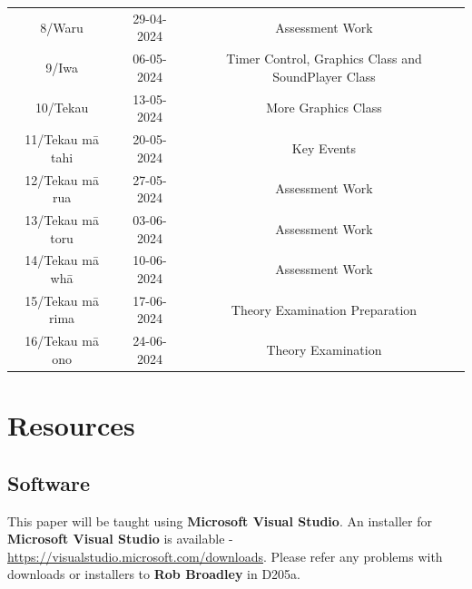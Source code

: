 \documentclass{article}
\begin{document}
\begin{tabular}{|c|c|c|c|}
	\rowcolor{yellow} \multicolumn{4}{|c|}{\footnotesize Mid Term Break}                                                                                                                         \\ \hline
	\footnotesize 8/Waru   & \footnotesize 29-04-2024 & \multicolumn{2}{c|}{\footnotesize Assessment Work}                                                   \\ \hline
	\footnotesize 9/Iwa            & \footnotesize 06-05-2024 & \multicolumn{2}{c|}{\footnotesize Timer Control, Graphics Class and SoundPlayer Class}                                                                 \\ \hline
	\footnotesize 10/Tekau         & \footnotesize 13-05-2024 & \multicolumn{2}{c|}{\footnotesize More Graphics Class}                                                                 \\ \hline
	\footnotesize 11/Tekau mā tahi & \footnotesize 20-05-2024 & \multicolumn{2}{c|}{\footnotesize Key Events}                                                                 \\ \hline
	\footnotesize 12/Tekau mā rua  & \footnotesize 27-05-2024 & \multicolumn{2}{c|}{\footnotesize Assessment Work}                                                                 \\ \hline
	\footnotesize 13/Tekau mā toru & \footnotesize 03-06-2024 & \multicolumn{2}{c|}{\footnotesize Assessment Work}                                                     \\ \hline
	\footnotesize 14/Tekau mā whā  & \footnotesize 10-06-2024 & \multicolumn{2}{c|}{\footnotesize Assessment Work} \\ \hline 
	\footnotesize 15/Tekau mā rima & \footnotesize 17-06-2024 & \multicolumn{2}{c|}{\footnotesize Theory Examination Preparation}                                                       \\ \hline
	\footnotesize 16/Tekau mā ono  & \footnotesize 24-06-2024 & \multicolumn{2}{c|}{\footnotesize Theory Examination}                                                         \\ \hline
\end{tabular}

\section*{Resources}

\subsection*{Software}
This paper will be taught using \textbf{Microsoft Visual Studio}. An installer for \textbf{Microsoft Visual Studio} is available - \href{https://visualstudio.microsoft.com/downloads}{https://visualstudio.microsoft.com/downloads}. Please refer any problems with downloads or installers to \textbf{Rob Broadley} in D205a.
\end{document}
